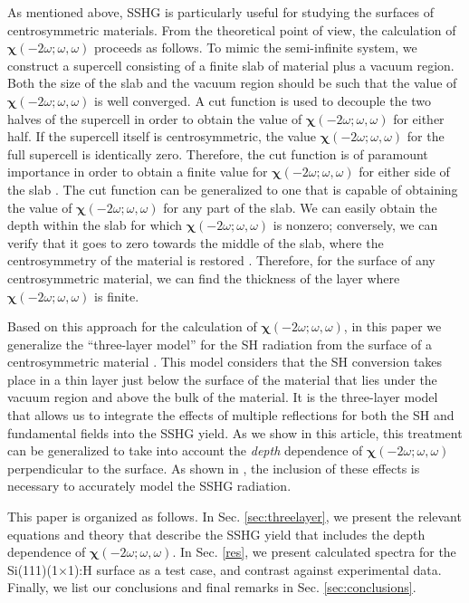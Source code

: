 \documentclass[utf8]{frontiersSCNS}
\begin{document}
As mentioned above, SSHG is particularly useful for studying the surfaces of
centrosymmetric materials. From the theoretical point of view, the calculation
of $\boldsymbol{\chi}(-2\omega;\omega,\omega)$ proceeds as follows. To mimic the
semi-infinite system, we construct a supercell consisting of a finite slab of
material plus a vacuum region. Both the size of the slab and the vacuum region
should be such that the value of $\boldsymbol{\chi}(-2\omega;\omega,\omega)$ is
well converged.  A cut function is used to decouple the two halves of the
supercell in order to obtain the value of
$\boldsymbol{\chi}(-2\omega;\omega,\omega)$ for either half. If the supercell
itself is centrosymmetric, the value $\boldsymbol{\chi}(-2\omega;\omega,\omega)$
for the full supercell is identically zero. Therefore, the cut function is of
paramount importance in order to obtain a finite value for
$\boldsymbol{\chi}(-2\omega;\omega,\omega)$ for either side of the slab
\citep{reiningPRB94,andersonPRB15,andersonPRB16a}. The cut function can be
generalized to one that is capable of obtaining the value of
$\boldsymbol{\chi}(-2\omega;\omega,\omega)$ for any part of the slab. We can
easily obtain the depth within the slab for which
$\boldsymbol{\chi}(-2\omega;\omega,\omega)$ is nonzero; conversely, we can
verify that it goes to zero towards the middle of the slab, where the
centrosymmetry of the material is restored \citep{mejiaRMF04}. Therefore, for
the surface of any centrosymmetric material, we can find the thickness of the
layer where $\boldsymbol{\chi}(-2\omega;\omega,\omega)$ is finite.

Based on this approach for the calculation of
$\boldsymbol{\chi}(-2\omega;\omega,\omega)$, in this paper we generalize the
``three-layer model'' for the SH radiation from the surface of a centrosymmetric
material \citep{andersonPRB16b}. This model considers that the SH conversion
takes place in a thin layer just below the surface of the material that lies
under the vacuum region and above the bulk of the material. It is the
three-layer model that allows us to integrate the effects of multiple
reflections for both the SH and fundamental fields into the SSHG yield. As we
show in this article, this treatment can be generalized to take into account the
\emph{depth} dependence of $\boldsymbol{\chi}(-2\omega;\omega,\omega)$
perpendicular to the surface. As shown in \cite{andersonPRB16b}, the inclusion
of these effects is necessary to accurately model the SSHG radiation.

This paper is organized as follows. In Sec. \ref{sec:threelayer}, we present the
relevant equations and theory that describe the SSHG yield that includes the
depth dependence of $\boldsymbol{\chi}(-2\omega;\omega,\omega)$.
In Sec. \ref{res}, we present calculated spectra for the Si(111)(1$\times$1):H
surface as a test case, and contrast against experimental data. Finally, we list
our conclusions and final remarks in Sec. \ref{sec:conclusions}.
\end{document}
